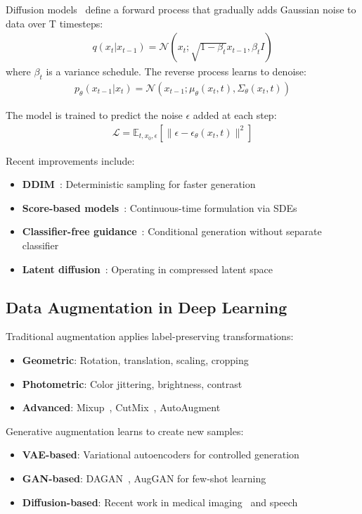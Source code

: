 \documentclass[journal]{IEEEtran}
\begin{document}
Diffusion models~\cite{sohl2015deep,ho2020denoising} define a forward process that gradually adds Gaussian noise to data over T timesteps:
\begin{align}
q(x_t|x_{t-1}) = \mathcal{N}(x_t; \sqrt{1-\beta_t}x_{t-1}, \beta_t I)
\end{align}
where $\beta_t$ is a variance schedule. The reverse process learns to denoise:
\begin{align}
p_\theta(x_{t-1}|x_t) = \mathcal{N}(x_{t-1}; \mu_\theta(x_t, t), \Sigma_\theta(x_t, t))
\end{align}

The model is trained to predict the noise $\epsilon$ added at each step:
\begin{align}
\mathcal{L} = \mathbb{E}_{t,x_0,\epsilon}[\|\epsilon - \epsilon_\theta(x_t, t)\|^2]
\end{align}

Recent improvements include:
\begin{itemize}
\item \textbf{DDIM}~\cite{song2021denoising}: Deterministic sampling for faster generation
\item \textbf{Score-based models}~\cite{song2021scorebased}: Continuous-time formulation via SDEs
\item \textbf{Classifier-free guidance}~\cite{ho2022classifierfree}: Conditional generation without separate classifier
\item \textbf{Latent diffusion}~\cite{rombach2022highresolution}: Operating in compressed latent space
\end{itemize}

\subsection{Data Augmentation in Deep Learning}

Traditional augmentation applies label-preserving transformations:
\begin{itemize}
\item \textbf{Geometric}: Rotation, translation, scaling, cropping
\item \textbf{Photometric}: Color jittering, brightness, contrast
\item \textbf{Advanced}: Mixup~\cite{zhang2018mixup}, CutMix~\cite{yun2019cutmix}, AutoAugment~\cite{cubuk2019autoaugment}
\end{itemize}

Generative augmentation learns to create new samples:
\begin{itemize}
\item \textbf{VAE-based}: Variational autoencoders for controlled generation
\item \textbf{GAN-based}: DAGAN~\cite{antoniou2017dagan}, AugGAN for few-shot learning
\item \textbf{Diffusion-based}: Recent work in medical imaging~\cite{pinaya2022brain} and speech~\cite{chen2023diffwave}
\end{itemize}
\end{document}
